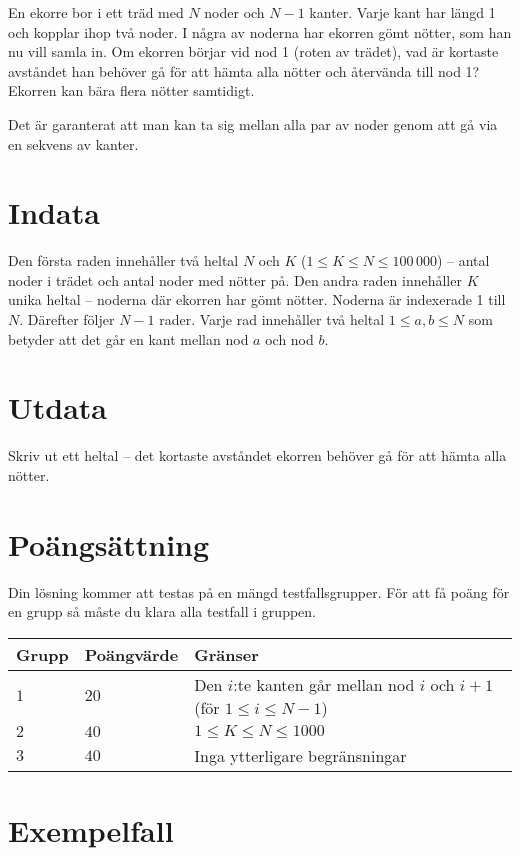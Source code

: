 
En ekorre bor i ett träd med $N$ noder och $N-1$ kanter.
Varje kant har längd 1 och kopplar ihop två noder.
I några av noderna har ekorren gömt nötter, som han nu vill samla in.
Om ekorren börjar vid nod 1 (roten av trädet),
vad är kortaste avståndet han behöver gå för att hämta alla nötter och återvända till nod 1? Ekorren kan bära flera nötter samtidigt.

Det är garanterat att man kan ta sig mellan alla par av noder genom att gå via en sekvens av kanter.


\section*{Indata}
Den första raden innehåller två heltal $N$ och $K$ ($1 \le K\le N \le 100\,000$) -- antal noder i trädet och antal noder med nötter på.
Den andra raden innehåller $K$ unika heltal -- noderna där ekorren har gömt nötter. Noderna är indexerade 1 till $N$.
Därefter följer $N-1$ rader. Varje rad innehåller två heltal $1 \le a,b \le N$ som betyder att det går en kant mellan nod $a$ och nod $b$.

\section*{Utdata}
Skriv ut ett heltal -- det kortaste avståndet ekorren behöver gå för att hämta alla nötter.

\section*{Poängsättning}
Din lösning kommer att testas på en mängd testfallsgrupper.
För att få poäng för en grupp så måste du klara alla testfall i gruppen.

\noindent
\begin{tabular}{| l | l | l |}
  \hline
  Grupp & Poängvärde & Gränser \\ \hline
  $1$    & $20$        &  Den $i$:te kanten går mellan nod $i$ och $i+1$ (för $1\le i \le N-1$) \\ \hline 
  $2$    & $40$        &  $1 \le K \le N \le 1000$ \\ \hline
  $3$    & $40$        &  Inga ytterligare begränsningar \\ \hline
\end{tabular}

\section*{Exempelfall}
